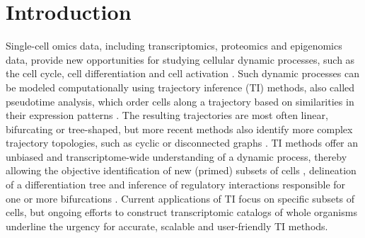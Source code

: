 \section{Introduction}
Single-cell omics data, including transcriptomics, proteomics and epigenomics data, provide new opportunities for studying cellular dynamic processes, such as the cell cycle, cell differentiation and cell activation \cite{tanay_scalingsinglecellgenomics_2017,etzrodt_quantitativesinglecellapproaches_2014}. Such dynamic processes can be modeled computationally using trajectory inference (TI) methods, also called pseudotime analysis, which order cells along a trajectory based on similarities in their expression patterns \cite{trapnell_definingcelltypes_2015,cannoodt_computationalmethodstrajectory_2016,moon_manifoldlearningbasedmethods_2018}. The resulting trajectories are most often linear, bifurcating or tree-shaped, but more recent methods also identify more complex trajectory topologies, such as cyclic \cite{liu_reconstructingcellcycle_2017} or disconnected graphs \cite{wolf_graphabstractionreconciles_2017}. TI methods offer an unbiased and transcriptome-wide understanding of a dynamic process\cite{tanay_scalingsinglecellgenomics_2017}, thereby allowing the objective identification of new (primed) subsets of cells \cite{schlitzer_identificationcdc1cdc2committed_2015}, delineation of a differentiation tree \cite{velten_humanhaematopoieticstem_2017,see_mappinghumandc_2017} and inference of regulatory interactions responsible for one or more bifurcations \cite{aibar_scenicsinglecellregulatory_2017}. Current applications of TI focus on specific subsets of cells, but ongoing efforts to construct transcriptomic catalogs of whole organisms \cite{regev_humancellatlas_2017,han_mappingmousecell_2018,schaum_singlecelltranscriptomics20_2018} underline the urgency for accurate, scalable \cite{aibar_scenicsinglecellregulatory_2017,angerer_singlecellsmake_2017} and user-friendly TI methods.


